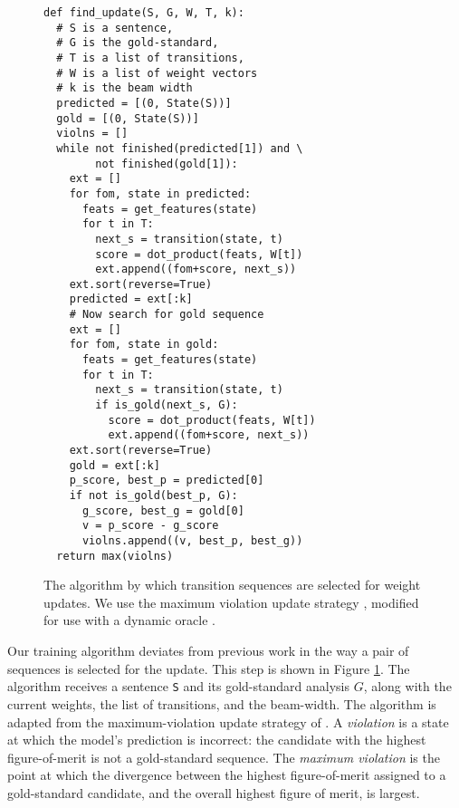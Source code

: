 \documentclass[11pt,letterpaper]{article}
\begin{document}
\begin{figure}
\small
\begin{verbatim}
def find_update(S, G, W, T, k):
  # S is a sentence,
  # G is the gold-standard,
  # T is a list of transitions,
  # W is a list of weight vectors
  # k is the beam width
  predicted = [(0, State(S))]
  gold = [(0, State(S))]
  violns = []
  while not finished(predicted[1]) and \
        not finished(gold[1]):
    ext = []
    for fom, state in predicted:
      feats = get_features(state)
      for t in T:
        next_s = transition(state, t)
        score = dot_product(feats, W[t])
        ext.append((fom+score, next_s))
    ext.sort(reverse=True)
    predicted = ext[:k]
    # Now search for gold sequence
    ext = []
    for fom, state in gold:
      feats = get_features(state)
      for t in T:
        next_s = transition(state, t)
        if is_gold(next_s, G):
          score = dot_product(feats, W[t])
          ext.append((fom+score, next_s))
    ext.sort(reverse=True)
    gold = ext[:k]
    p_score, best_p = predicted[0]
    if not is_gold(best_p, G):
      g_score, best_g = gold[0]
      v = p_score - g_score
      violns.append((v, best_p, best_g))
  return max(violns)
\end{verbatim}
\caption{\small The algorithm by which transition sequences are selected for
    weight updates. We use the maximum violation update strategy \citep{huang:12},
    modified for use with a dynamic oracle \citep{goldberg:12}.
    \label{fig:train_code}}
\end{figure}
Our training algorithm deviates from previous work in the way a pair of sequences
is selected for the update.  This step is shown in Figure \ref{fig:train_code}.
The algorithm receives a sentence \verb|S| and its
gold-standard analysis $G$, along with the current weights, the list of transitions,
and the beam-width.
The algorithm is adapted from the maximum-violation update strategy of \citet{huang:12}.
A \emph{violation} is a state at which the model's prediction is incorrect: the
candidate with the highest figure-of-merit is not a gold-standard sequence.  The
\emph{maximum violation} is the point at which the divergence between the highest
figure-of-merit assigned to a gold-standard candidate, and the overall highest
figure of merit, is largest.
\end{document}
